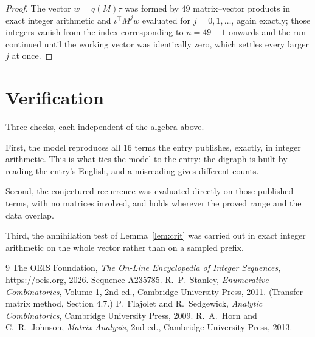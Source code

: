 \documentclass[11pt,a4paper]{article}
\theoremstyle{plain}
\theoremstyle{definition}
\begin{document}
\begin{proof}
The vector $w=q(M)\tau$ was formed by $49$ matrix--vector products in exact integer
arithmetic and $\iota^{\!\top}M^{j}w$ evaluated for $j=0,1,\dots$, again exactly; those
integers vanish from the index corresponding to $n=49+1$ onwards and the run continued
until the working vector was identically zero, which settles every larger $j$ at once.
\end{proof}

\section{Verification}

Three checks, each independent of the algebra above.

First, the model reproduces all $16$ terms the entry publishes, exactly, in integer
arithmetic. This is what ties the model to the entry: the digraph is built by reading the
entry's English, and a misreading gives different counts.

Second, the conjectured recurrence was evaluated directly on those published terms, with no
matrices involved, and holds wherever the proved range and the data overlap.

Third, the annihilation test of Lemma~\ref{lem:crit} was carried out in exact integer
arithmetic on the whole vector rather than on a sampled prefix.

\begin{thebibliography}{9}
 The OEIS Foundation, \emph{The On-Line Encyclopedia of Integer
Sequences}, \url{https://oeis.org}, 2026. Sequence A235785.
 R.~P.~Stanley, \emph{Enumerative Combinatorics}, Volume 1, 2nd ed.,
Cambridge University Press, 2011. (Transfer-matrix method, Section 4.7.)
 P.~Flajolet and R.~Sedgewick, \emph{Analytic Combinatorics}, Cambridge
University Press, 2009.
 R.~A.~Horn and C.~R.~Johnson, \emph{Matrix Analysis}, 2nd ed., Cambridge
University Press, 2013.
\end{thebibliography}
\end{document}
